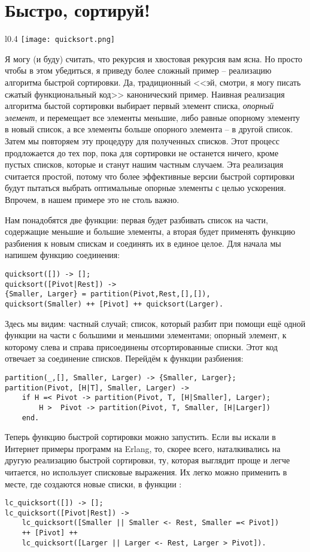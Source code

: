 \section{Быстро, сортируй!}
\begin{wrapfigure}{l}{0.4\linewidth}
    \texttt{[image: quicksort.png]}
\end{wrapfigure}
Я могу (и буду) считать, что рекурсия и хвостовая рекурсия вам ясна.
Но просто чтобы в этом убедиться, я приведу более сложный пример \--- реализацию алгоритма быстрой сортировки.
Да, традиционный <<эй, смотри, я могу писать сжатый функциональный код>> канонический пример.
Наивная реализация алгоритма быстой сортировки выбирает первый элемент списка, \emph{опорный элемент}, и перемещает все элементы меньшие, либо равные опорному элементу в новый список, а все элементы больше опорного элемента \--- в другой список.
Затем мы повторяем эту процедуру для полученных списков.
Этот процесс продложается до тех пор, пока для сортировки не останется ничего, кроме пустых списков, которые и станут нашим частным случаем.
Эта реализация считается простой, потому что более эффективные версии быстрой сортировки будут пытаться выбрать оптимальные опорные элементы с целью ускорения.
Впрочем, в нашем примере это не столь важно.

Нам понадобятся две функции: первая будет разбивать список на части, содержащие меньшие и большие элементы, а вторая будет применять функцию разбиения к новым спискам и соединять их в единое целое.
Для начала мы напишем функцию соединения:
\begin{lstlisting}[style=erlang]
quicksort([]) -> [];
quicksort([Pivot|Rest]) ->
{Smaller, Larger} = partition(Pivot,Rest,[],[]),
quicksort(Smaller) ++ [Pivot] ++ quicksort(Larger).
\end{lstlisting}

Здесь мы видим: частный случай; список, который разбит при помощи ещё одной функции на части с большими и меньшими элементами; опорный элемент, к которому слева и справа присоединены отсортированные списки.
Этот код отвечает за соединение списков.
Перейдём к функции разбиения:
\begin{lstlisting}[style=erlang]
partition(_,[], Smaller, Larger) -> {Smaller, Larger};
partition(Pivot, [H|T], Smaller, Larger) ->
    if H =< Pivot -> partition(Pivot, T, [H|Smaller], Larger);
        H >  Pivot -> partition(Pivot, T, Smaller, [H|Larger])
    end.
\end{lstlisting}

Теперь функцию быстрой сортировки можно запустить.
Если вы искали в Интернет примеры программ на Erlang, то, скорее всего, наталкивались на другую реализацию быстрой сортировки, ту, которая выглядит проще и легче читается, но использует списковые выражения.
Их легко можно применить в месте, где создаются новые списки, в функции :
\begin{lstlisting}[style=erlang]
lc_quicksort([]) -> [];
lc_quicksort([Pivot|Rest]) ->
    lc_quicksort([Smaller || Smaller <- Rest, Smaller =< Pivot])
    ++ [Pivot] ++
    lc_quicksort([Larger || Larger <- Rest, Larger > Pivot]).
\end{lstlisting}

